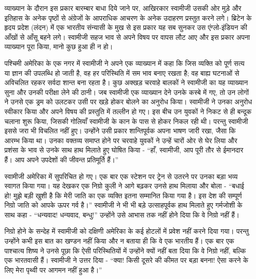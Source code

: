 व्याख्यान के दौरान इस प्रकार बारम्बार बाधा दिये जाने पर, आखिरकार स्वामीजी उसकी ओर मुड़े और इतिहास के अनेक पृष्ठों से अंग्रेजों के आपराधिक आचरण के अनेक उदाहरण प्रस्तुत करने लगे। ब्रिटेन के हृदय प्रदेश (लंदन) में एक भारतीय संन्यासी के मुख से इस प्रकार यह सब सुनकर उस एंग्लो-इंडियन की आँखों से आँसू बहने लगे। स्वामीजी सहज भाव से अपने विषय पर वापस लौट आए और इस प्रकार अपना व्याख्यान पूरा किया, मानो कुछ हुआ ही न हो। 

\delimiter

पश्चिमी अमेरिका के एक नगर में स्वामीजी ने अपने एक व्याख्यान में कहा कि जिस व्यक्ति को पूर्ण सत्य या ज्ञान की उपलब्धि हो जाती है, वह हर परिस्थिति में सम भाव बनाए रखता है; वह बाह्य घटनाओं से अविचलित रहकर सर्वदा शान्त बना रहता है। कुछ अक्खड़ चरवाहे बालकों ने स्वामीजी का यह व्याख्यान सुना और उनकी परीक्षा लेने की ठानी। जब स्वामीजी एक व्याख्यान देने उनके कस्बे में गए, तो उन लोगों ने उनसे एक ड्रम को उलटकर उसी पर खड़े होकर बोलने का अनुरोध किया। स्वामीजी ने उनका अनुरोध स्वीकार किया और अपने विषय की प्रस्तुति में तल्लीन हो गए। इस बीच उन युवकों ने निकट से ही बन्दूक चलाना शुरू किया, जिसकी गोलियाँ स्वामीजी के कान के पास से होकर निकल रही थी। परन्तु स्वामीजी इससे जरा भी विचलित नहीं हुए। उन्होंने उसी प्रकार शान्तिपूर्वक अपना भाषण जारी रखा, जैसा कि आरम्भ किया था। उनका वक्तव्य समाप्त होने पर चरवाहे युवकों ने उन्हें चारों ओर से घेर लिया और प्रशंसा के भाव से उनके साथ हाथ मिलाते हुए घोषित किया - “हाँ, स्वामीजी, आप पूरी तौर से ईमानदार हैं। आप अपने उपदेशों की जीवन्त प्रतिमूर्ति हैं।” 

\delimiter

स्वामीजी अमेरिका में सुपरिचित हो गए। एक बार एक स्टेशन पर ट्रेन से उतरने पर उनका बड़ा भव्य स्वागत किया गया। यह देखकर एक निग्रो कुली ने आगे बढ़कर उनसे हाथ मिलाया और बोला - “बधाई हो! मुझे बड़ी खुशी है कि मेरी जाति का एक व्यक्ति इतना सम्मानित किया गया है। इस देश की सम्पूर्ण निग्रो जाति को आपके ऊपर गर्व है।” स्वामीजी ने भी भी बड़े उत्साहपूर्वक हाथ मिलाते हुए गर्मजोशी के साथ कहा - “धन्यवाद! धन्यवाद, बन्धु!” उन्होंने उसे आभास तक नहीं होने दिया कि वे निग्रो नहीं हैं। 

निग्रो होने के सन्देह में स्वामीजी को दक्षिणी अमेरिका के कई होटलों में प्रवेश नहीं करने दिया गया। परन्तु उन्होंने कभी इस बात का खण्डन नहीं किया और न बताया ही कि वे एक भारतीय हैं। एक बार एक पाश्चात्य शिष्य ने उनसे पूछा कि ऐसी परिस्थितियों में उन्होंने क्यों नहीं बता दिया कि वे निग्रो नहीं, बल्कि एक भारतवासी हैं। स्वामीजी ने उत्तर दिया - “क्या! किसी दूसरे की कीमत पर बड़ा बनना! ऐसा करने के लिए मेरा पृथ्वी पर आगमन नहीं हुआ है।” 

\vskip -8pt

\delimiter

